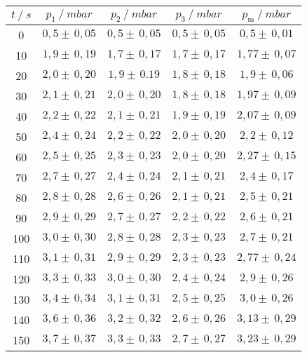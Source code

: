 \begin{table}[H]
  \centering
  \begin{tabular}{c|c|c|c|c}
    {$t \:/\: \si{s}$} & {$p_1 \:/\: \si{mbar} $} & {$p_2 \:/\: \si{mbar} $} & {$p_3 \:/\: \si{mbar} $} & {$p_{\text{m}} \:/\: \si{mbar}$}\\
  \midrule
  0     & $ 0,5  \pm \,  0,05 $ & $ 0,5  \pm \,  0,05 $ & $ 0,5  \pm \,  0,05 $ & $ 0,5   \pm \,  0,01 $ \\
  10    & $ 1,9  \pm \,  0,19 $ & $ 1,7  \pm \,  0,17 $ & $ 1,7  \pm \,  0,17 $ & $ 1,77  \pm \,  0,07 $ \\
  20    & $ 2,0  \pm \,  0,20 $ & $ 1,9  \pm \,  0.19 $ & $ 1,8  \pm \,  0,18 $ & $ 1,9   \pm \,  0,06 $ \\
  30    & $ 2,1  \pm \,  0,21 $ & $ 2,0  \pm \,  0,20 $ & $ 1,8  \pm \,  0,18 $ & $ 1,97  \pm \,  0,09 $ \\
  40    & $ 2,2  \pm \,  0,22 $ & $ 2,1  \pm \,  0,21 $ & $ 1,9  \pm \,  0,19 $ & $ 2,07  \pm \,  0,09 $ \\
  50    & $ 2,4  \pm \,  0,24 $ & $ 2,2  \pm \,  0,22 $ & $ 2,0  \pm \,  0,20 $ & $ 2,2   \pm \,  0,12 $ \\
  60    & $ 2,5  \pm \,  0,25 $ & $ 2,3  \pm \,  0,23 $ & $ 2,0  \pm \,  0,20 $ & $ 2,27  \pm \,  0,15 $ \\
  70    & $ 2,7  \pm \,  0,27 $ & $ 2,4  \pm \,  0,24 $ & $ 2,1  \pm \,  0,21 $ & $ 2,4   \pm \,  0,17 $ \\
  80    & $ 2,8  \pm \,  0,28 $ & $ 2,6  \pm \,  0,26 $ & $ 2,1  \pm \,  0,21 $ & $ 2,5   \pm \,  0,21 $ \\
  90    & $ 2,9  \pm \,  0,29 $ & $ 2,7  \pm \,  0,27 $ & $ 2,2  \pm \,  0,22 $ & $ 2,6   \pm \,  0,21 $ \\
  100   & $ 3,0  \pm \,  0,30 $ & $ 2,8  \pm \,  0,28 $ & $ 2,3  \pm \,  0,23 $ & $ 2,7   \pm \,  0,21 $ \\
  110   & $ 3,1  \pm \,  0,31 $ & $ 2,9  \pm \,  0,29 $ & $ 2,3  \pm \,  0,23 $ & $ 2,77  \pm \,  0,24 $ \\
  120   & $ 3,3  \pm \,  0,33 $ & $ 3,0  \pm \,  0,30 $ & $ 2,4  \pm \,  0,24 $ & $ 2,9   \pm \,  0,26 $ \\
  130   & $ 3,4  \pm \,  0,34 $ & $ 3,1  \pm \,  0,31 $ & $ 2,5  \pm \,  0,25 $ & $ 3,0   \pm \,  0,26 $ \\
  140   & $ 3,6  \pm \,  0,36 $ & $ 3,2  \pm \,  0,32 $ & $ 2,6  \pm \,  0,26 $ & $ 3,13  \pm \,  0,29 $ \\
  150   & $ 3,7  \pm \,  0,37 $ & $ 3,3  \pm \,  0,33 $ & $ 2,7  \pm \,  0,27 $ & $ 3,23  \pm \,  0,29 $ \\

\end{tabular}
\end{table}
